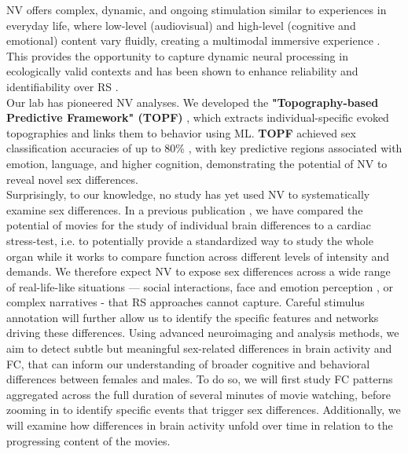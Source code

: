 \documentclass[11pt,a4paper]{article}
\begin{document}
NV offers complex, dynamic, and ongoing stimulation similar to experiences in everyday life, 
where low-level (audiovisual) and high-level (cognitive and emotional) content vary fluidly, 
creating a multimodal immersive experience \parencite{sonkusareNaturalisticStimuliNeuroscience2019}. 
This provides the opportunity to capture dynamic neural processing in ecologically valid contexts 
\parencite{vanderwalMoviesMagnetNaturalistic2019} and has been shown to enhance reliability and identifiability 
over RS \parencite{krollNaturalisticViewingIncreases2023}.\\
Our lab has pioneered NV analyses. We developed the \textbf{"Topography-based Predictive Framework" (TOPF)}
\parencite{liTopographybasedPredictiveFramework2023a}, which extracts individual-specific evoked 
topographies and links them to behavior using ML.
\textbf{TOPF} achieved sex classification accuracies of up to 80\% \parencite{liStimulusSelectionInfluences2025a}, 
with key predictive regions associated with emotion, language, and higher cognition, demonstrating the potential of NV to 
reveal novel sex differences.\\
Surprisingly, to our knowledge, no study has yet used NV to systematically examine sex differences. 
In a previous publication \parencite{eickhoffClinicalApplicationsMovie2020a}, we have compared the potential of 
movies for the study of individual brain differences to a cardiac stress-test, 
i.e. to potentially provide a standardized way to study the whole organ while it works to compare function 
across different levels of intensity and demands. 
We therefore expect NV to expose sex differences across a wide range of real-life-like situations — social interactions, 
face and emotion perception \parencite{sonkusareNaturalisticStimuliNeuroscience2019}, 
or complex narratives - that RS approaches cannot capture. Careful stimulus annotation will further allow us to identify the 
specific features and networks driving these differences.
Using advanced neuroimaging and analysis methods, we aim to detect subtle but meaningful sex-related differences 
in brain activity and FC, that can inform our understanding of 
broader cognitive and behavioral differences between females and males.
To do so, we will first study FC patterns aggregated across the full duration of several minutes of movie watching, before zooming
in to identify specific events that trigger sex differences. Additionally, we will examine how differences in brain activity
unfold over time in relation to the progressing content of the movies.\\
\end{document}
